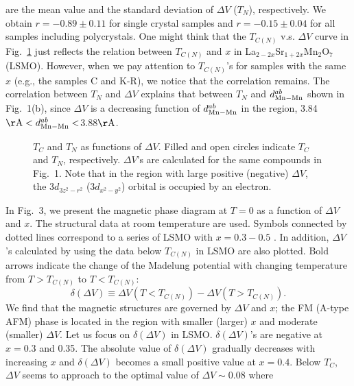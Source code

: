 are the mean value and the standard deviation of $\Delta V$ ($T_N$), respectively.  
We obtain $r=-0.89 \pm 0.11$ for single crystal samples 
and $r=-0.15 \pm 0.04$ for all samples including polycrystals. 
%
One might think that the $T_{C(N)}$ v.s. $\Delta V$ curve in Fig.~\ref{fig:fig2} 
just reflects the relation between $T_{C(N)}$ and $x$ in 
La$_{2-2x}$Sr$_{1+2x}$Mn$_2$O$_7$ (LSMO)\cite{kubota,medarde}.  
However, when we pay attention to $T_{C(N)}$'s for samples with the same $x$ 
(e.g., the samples C and K-R), we notice that the correlation remains. 
%
The correlation between $T_N$ and $\Delta V$ explains that between $T_N$ and 
$d_{\rm Mn-Mn}^{ab}$ shown in Fig.~1(b), 
since $\Delta V$ is a decreasing function of $d_{\rm Mn-Mn}^{ab}$ in the 
region, 3.84${\rm \AA} < d^{ab}_{\rm Mn-Mn} <$3.88$\rm \AA$. 
%
%
\begin{figure}
\columnwidth
\centerline{}
\caption{$T_C$ and $T_N$ as functions of  
$\Delta V$. 
Filled and open circles indicate $T_C$ and $T_N$, respectively.
$\Delta V$'s are calculated for the same compounds in Fig.~1. 
Note that in the region with large positive (negative) $\Delta V$, 
the $3d_{3z^2-r^2}$ ($3d_{x^2-y^2}$) orbital is occupied by an electron.}
\label{fig:fig2}
\end{figure}
%
\par
%
%
In Fig.~3, we present the magnetic phase diagram at $T=0$ as a function of 
$\Delta V$ and $x$. 
The structural data at room temperature are used.
Symbols connected by dotted lines correspond to a series of 
LSMO with $x=0.3-0.5$ \cite{kubota}. 
In addition, $\Delta V$'s calculated by using the data below $T_{C(N)}$ in LSMO are also plotted. 
Bold arrows indicate the change of the Madelung potential 
with changing temperature from $T>T_{C(N)}$ to $T<T_{C(N)}$: 
%
\begin{equation}
\delta (\Delta V) \equiv \Delta V(T<T_{C(N)})-\Delta V(T>T_{C(N)}) . 
\label{eq:deltv}
\end{equation}
%
%
We find that 
the magnetic structures are governed by $\Delta V$ and $x$; 
the FM (A-type AFM) phase is located in the region with 
smaller (larger) $x$ and moderate (smaller) $\Delta V$.  
%
Let us focus on $\delta (\Delta V)$ in LSMO. 
%
$\delta (\Delta V)$'s are negative at $x=0.3$ and 0.35. 
The absolute value of $\delta (\Delta V)$
gradually decreases with increasing $x$ and 
$\delta (\Delta V)$ becomes a small positive value at $x=0.4$.
Below $T_C$, $\Delta V$ seems to approach to the optimal value of $\Delta V \sim 0.08$ where 
